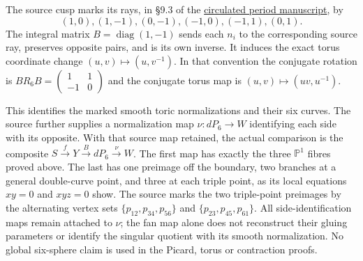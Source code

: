 The source cusp marks its rays, in \S9.3 of the
\href{https://alpo.ge/s6.pdf}{circulated period manuscript}, by
\[
(1,0),(1,-1),(0,-1),(-1,0),(-1,1),(0,1).
\]
The integral matrix $B=\operatorname{diag}(1,-1)$ sends each $n_i$ to the
corresponding source ray, preserves opposite pairs, and is its own inverse.
It induces the exact torus coordinate change $(u,v)\mapsto(u,v^{-1})$.
In that convention the conjugate rotation is
$BR_6B=\left(\begin{smallmatrix}1&1\\-1&0\end{smallmatrix}\right)$ and
the conjugate torus map is $(u,v)\mapsto(uv,u^{-1})$.

This identifies the marked smooth toric normalizations and their six
curves. The source further supplies a normalization map $\nu:dP_6\to W$
identifying each side with its opposite. With that source map retained,
the actual comparison is the composite $S\xrightarrow{f}Y\xrightarrow{B}
dP_6\xrightarrow{\nu}W$. The first map has exactly the three
$\mathbb P^1$ fibres proved above. The last has one preimage off the
boundary, two branches at a general double-curve point, and three at each
triple point, as its local equations $xy=0$ and $xyz=0$ show. The source
marks the two triple-point preimages by the alternating vertex sets
$\{p_{12},p_{34},p_{56}\}$ and $\{p_{23},p_{45},p_{61}\}$.
All side-identification maps remain attached to $\nu$; the fan map alone
does not reconstruct their gluing parameters or identify the singular
quotient with its smooth normalization. No global six-sphere claim is used
in the Picard, torus or contraction proofs.
